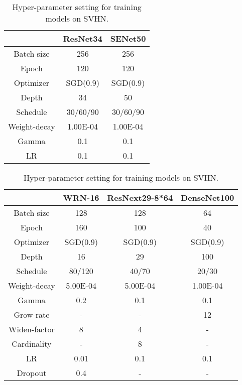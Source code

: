 \documentclass[11pt]{article}
\begin{document}
\begin{table}[htbp]
\scriptsize
\begin{minipage}[b]{0.4\linewidth}

  \centering
     \begin{tabular}{|c|c|c|}
    \toprule
          & ResNet34 & SENet50 \\
    \midrule
    Batch size & 256   & 256 \\
    Epoch & 120   & 120 \\
    Optimizer & SGD(0.9) & SGD(0.9) \\
    Depth & 34    & 50 \\
    Schedule & 30/60/90 & 30/60/90 \\
    Weight-decay    & 1.00E-04 & 1.00E-04 \\
    Gamma & 0.1   & 0.1 \\
    LR    & 0.1   & 0.1 \\
    \bottomrule
    \end{tabular}\caption{Hyper-parameter setting for training models on ImageNet.}
  \label{tab:imgnet}\end{minipage}
\hspace{.5in}
\begin{minipage}[b]{0.5\linewidth}


  \centering
    \begin{tabular}{|c|c|c|c|}
    \toprule
          & WRN-16 & ResNext29-8*64 & DenseNet100 \\
    \midrule
    Batch size & 128   & 128   & 64 \\
    Epoch & 160   & 100   & 40 \\
    Optimizer & SGD(0.9) & SGD(0.9) & SGD(0.9) \\
    Depth & 16    & 29    & 100 \\
    Schedule & 80/120 & 40/70 & 20/30 \\
    Weight-decay & 5.00E-04 & 5.00E-04 & 1.00E-04 \\
    Gamma & 0.2   & 0.1   & 0.1 \\
    Grow-rate & -     & -     & 12 \\
    Widen-factor & 8     & 4     & - \\
    Cardinality & -     & 8     & - \\
    LR    & 0.01  & 0.1   & 0.1 \\
    Dropout & 0.4   & -     & - \\
    \bottomrule
    \end{tabular}\caption{Hyper-parameter setting for training models on SVHN.}
 \label{tab:svhn}\end{minipage}
\end{table}
\end{document}
